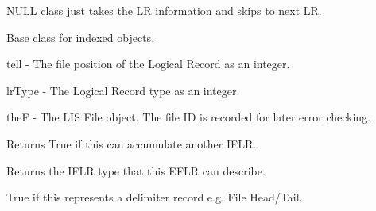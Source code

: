 \documentclass[letterpaper,10pt,english]{sphinxmanual}
\begin{document}
\begin{fulllineitems}
\label{\detokenize{ref/LIS/core/FileIndexer:TotalDepth.LIS.core.FileIndexer.IndexNone}}
NULL class just takes the LR information and skips to next LR.

\end{fulllineitems}


\begin{fulllineitems}
\label{\detokenize{ref/LIS/core/FileIndexer:TotalDepth.LIS.core.FileIndexer.IndexObjBase}}
Base class for indexed objects.

tell - The file position of the Logical Record as an integer.

lrType - The Logical Record type as an integer.

theF - The LIS File object. The file ID is recorded for later error checking.

\begin{fulllineitems}
\label{\detokenize{ref/LIS/core/FileIndexer:TotalDepth.LIS.core.FileIndexer.IndexObjBase.canAdd}}
Returns True if this can accumulate another IFLR.

\end{fulllineitems}


\begin{fulllineitems}
\label{\detokenize{ref/LIS/core/FileIndexer:TotalDepth.LIS.core.FileIndexer.IndexObjBase.iflrType}}
Returns the IFLR type that this EFLR can describe.

\end{fulllineitems}


\begin{fulllineitems}
\label{\detokenize{ref/LIS/core/FileIndexer:TotalDepth.LIS.core.FileIndexer.IndexObjBase.isDelimiter}}
True if this represents a delimiter record e.g. File Head/Tail.


\end{fulllineitems}
\end{fulllineitems}
\end{document}
